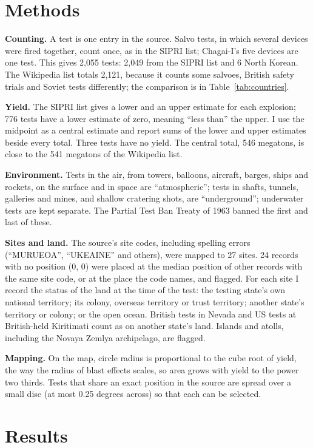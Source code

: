 \documentclass[11pt,a4paper]{article}
\begin{document}
\section{Methods}
\textbf{Counting.} A test is one entry in the source. Salvo tests, in which several devices were fired together, count once, as in the SIPRI list; Chagai-I's five devices are one test. This gives 2,055 tests: 2,049 from the SIPRI list and 6 North Korean. The Wikipedia list totals 2,121, because it counts some salvoes, British safety trials and Soviet tests differently; the comparison is in Table~\ref{tab:countries}.

\textbf{Yield.} The SIPRI list gives a lower and an upper estimate for each explosion; 776 tests have a lower estimate of zero, meaning ``less than'' the upper. I use the midpoint as a central estimate and report sums of the lower and upper estimates beside every total. Three tests have no yield. The central total, 546 megatons, is close to the 541 megatons of the Wikipedia list.

\textbf{Environment.} Tests in the air, from towers, balloons, aircraft, barges, ships and rockets, on the surface and in space are ``atmospheric''; tests in shafts, tunnels, galleries and mines, and shallow cratering shots, are ``underground''; underwater tests are kept separate. The Partial Test Ban Treaty of 1963 banned the first and last of these.

\textbf{Sites and land.} The source's site codes, including spelling errors (``MURUEOA'', ``UKEAINE'' and others), were mapped to 27 sites. 24 records with no position (0, 0) were placed at the median position of other records with the same site code, or at the place the code names, and flagged. For each site I record the status of the land at the time of the test: the testing state's own national territory; its colony, overseas territory or trust territory; another state's territory or colony; or the open ocean. British tests in Nevada and US tests at British-held Kiritimati count as on another state's land. Islands and atolls, including the Novaya Zemlya archipelago, are flagged.

\textbf{Mapping.} On the map, circle radius is proportional to the cube root of yield, the way the radius of blast effects scales, so area grows with yield to the power two thirds. Tests that share an exact position in the source are spread over a small disc (at most 0.25 degrees across) so that each can be selected.

\section{Results}
\end{document}

